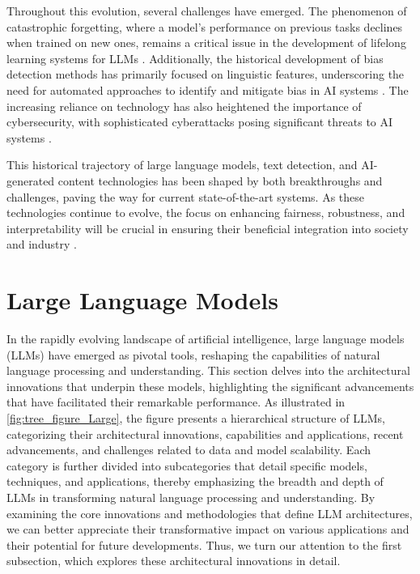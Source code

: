 Throughout this evolution, several challenges have emerged. The phenomenon of catastrophic forgetting, where a model's performance on previous tasks declines when trained on new ones, remains a critical issue in the development of lifelong learning systems for LLMs \cite{zhao2022lifelonglearningmultilingualneural}. Additionally, the historical development of bias detection methods has primarily focused on linguistic features, underscoring the need for automated approaches to identify and mitigate bias in AI systems \cite{spinde2021identificationbiasedtermsnews}. The increasing reliance on technology has also heightened the importance of cybersecurity, with sophisticated cyberattacks posing significant threats to AI systems \cite{m2023comparativeanalysisimbalancedmalware}.



This historical trajectory of large language models, text detection, and AI-generated content technologies has been shaped by both breakthroughs and challenges, paving the way for current state-of-the-art systems. As these technologies continue to evolve, the focus on enhancing fairness, robustness, and interpretability will be crucial in ensuring their beneficial integration into society and industry .









\section{Large Language Models} \label{sec:Large Language Models}


In the rapidly evolving landscape of artificial intelligence, large language models (LLMs) have emerged as pivotal tools, reshaping the capabilities of natural language processing and understanding. This section delves into the architectural innovations that underpin these models, highlighting the significant advancements that have facilitated their remarkable performance. As illustrated in \autoref{fig:tree_figure_Large}, the figure presents a hierarchical structure of LLMs, categorizing their architectural innovations, capabilities and applications, recent advancements, and challenges related to data and model scalability. Each category is further divided into subcategories that detail specific models, techniques, and applications, thereby emphasizing the breadth and depth of LLMs in transforming natural language processing and understanding. By examining the core innovations and methodologies that define LLM architectures, we can better appreciate their transformative impact on various applications and their potential for future developments. Thus, we turn our attention to the first subsection, which explores these architectural innovations in detail.

